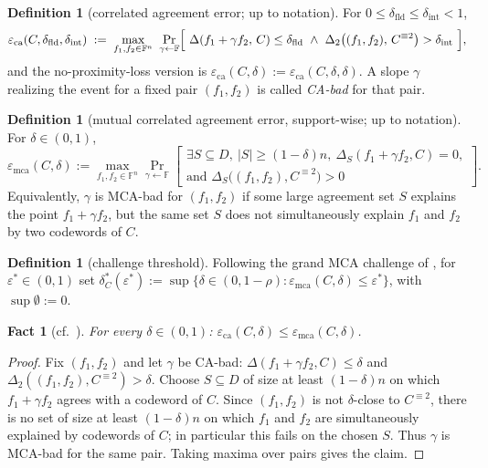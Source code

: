 \documentclass[11pt]{article}
\newtheorem{fact}[theorem]{Fact}
\theoremstyle{definition}
\newtheorem{definition}[theorem]{Definition}
\theoremstyle{remark}
\newcommand{\F}{\mathbb{F}}
\newcommand{\eca}{\varepsilon_{\mathrm{ca}}}
\newcommand{\emca}{\varepsilon_{\mathrm{mca}}}
\newcommand{\dist}{\Delta}
\newcommand{\distS}{\Delta_S}
\begin{document}
\begin{definition}[correlated agreement error; {\cite[Def.~4.1]{ABF26}} up to notation]\label{def:ca}
For $0\le\delta_{\mathrm{fld}}\le\delta_{\mathrm{int}}<1$,
\[
\eca(C,\delta_{\mathrm{fld}},\delta_{\mathrm{int}})\;:=\;\max_{f_1,f_2\in\F^n}\ \Pr_{\gamma\leftarrow\F}\Bigl[\ \dist(f_1+\gamma f_2,\,C)\le\delta_{\mathrm{fld}}\ \wedge\ \dist_2\bigl((f_1,f_2),\,C^{\equiv2}\bigr)>\delta_{\mathrm{int}}\ \Bigr],
\]
and the no-proximity-loss version is $\eca(C,\delta):=\eca(C,\delta,\delta)$. A slope $\gamma$ realizing the event for a fixed pair $(f_1,f_2)$ is called \emph{CA-bad} for that pair.
\end{definition}

\begin{definition}[mutual correlated agreement error, support-wise; {\cite[Def.~4.3]{ABF26}} up to notation]\label{def:mca}
For $\delta\in(0,1)$,
\[
\emca(C,\delta):=\max_{f_1,f_2\in\F^n}\Pr_{\gamma\leftarrow\F}\left[
\begin{array}{l}
\exists S\subseteq D,\ |S|\ge(1-\delta)n,\ \distS(f_1+\gamma f_2,C)=0,\\[2pt]
\text{and }\distS\bigl((f_1,f_2),C^{\equiv2}\bigr)>0
\end{array}
\right].
\]
Equivalently, $\gamma$ is MCA-bad for $(f_1,f_2)$ if some large agreement set $S$ explains the point $f_1+\gamma f_2$, but the same set $S$ does not simultaneously explain $f_1$ and $f_2$ by two codewords of $C$.
\end{definition}

\begin{definition}[challenge threshold]\label{def:dstar}
Following the grand MCA challenge of \cite[\S1]{ABF26}, for $\varepsilon^*\in(0,1)$ set
$\delta^*_C(\varepsilon^*):=\sup\{\delta\in(0,1-\rho):\emca(C,\delta)\le\varepsilon^*\}$, with $\sup\emptyset:=0$.
\end{definition}

\begin{fact}[{cf.\ \cite[Fact~4.5]{ABF26}}]\label{fact:chain}
For every $\delta\in(0,1)$: $\eca(C,\delta)\le\emca(C,\delta)$.
\end{fact}

\begin{proof}
Fix $(f_1,f_2)$ and let $\gamma$ be CA-bad: $\dist(f_1+\gamma f_2,C)\le\delta$ and $\dist_2((f_1,f_2),C^{\equiv2})>\delta$. Choose $S\subseteq D$ of size at least $(1-\delta)n$ on which $f_1+\gamma f_2$ agrees with a codeword of $C$. Since $(f_1,f_2)$ is not $\delta$-close to $C^{\equiv2}$, there is no set of size at least $(1-\delta)n$ on which $f_1$ and $f_2$ are simultaneously explained by codewords of $C$; in particular this fails on the chosen $S$. Thus $\gamma$ is MCA-bad for the same pair. Taking maxima over pairs gives the claim.
\end{proof}
\end{document}
